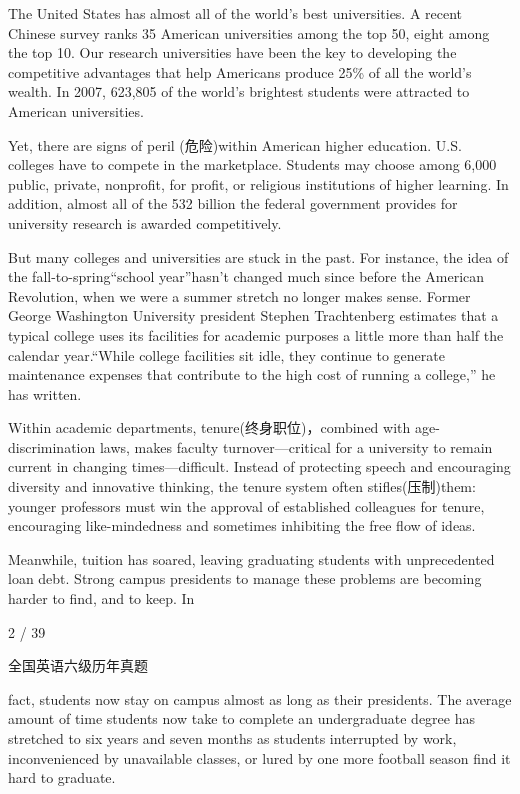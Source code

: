 \documentclass[UTF8,11pt]{ctexart}
\begin{document}
The United States has almost all of the world’s best universities. A recent Chinese survey ranks 35 American universities among the top 50, eight among the top 10. Our research universities have been the key to developing the competitive advantages that help Americans produce 25\% of all the world’s wealth. In 2007, 623,805 of the world’s brightest students were attracted to American universities.


Yet, there are signs of peril (危险)within American higher education. U.S. colleges have to compete in the marketplace. Students may choose among 6,000 public, private, nonprofit, for profit, or religious institutions of higher learning. In addition, almost all of the 532 billion the federal government provides for university research is awarded competitively.


But many colleges and universities are stuck in the past. For instance, the idea of the fall-to-spring“school year”hasn’t changed much since before the American Revolution, when we were a summer stretch no longer makes sense. Former George Washington University president Stephen Trachtenberg estimates that a typical college uses its facilities for academic purposes a little more than half the calendar year.“While college facilities sit idle, they continue to generate maintenance expenses that contribute to the high cost of running a college,” he has written.


Within academic departments, tenure(终身职位)，combined with age-discrimination laws, makes faculty turnover—critical for a university to remain current in changing times—difficult. Instead of protecting speech and encouraging diversity and innovative thinking, the tenure system often stifles(压制)them: younger professors must win the approval of established colleagues for tenure, encouraging like-mindedness and sometimes inhibiting the free flow of ideas.


Meanwhile, tuition has soared, leaving graduating students with unprecedented loan debt. Strong campus presidents to manage these problems are becoming harder to find, and to keep. In


2 / 39


全国英语六级历年真题


fact, students now stay on campus almost as long as their presidents. The average amount of time students now take to complete an undergraduate degree has stretched to six years and seven months as students interrupted by work, inconvenienced by unavailable classes, or lured by one more football season find it hard to graduate.
\end{document}
